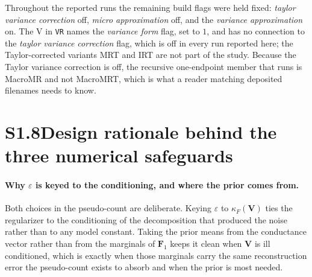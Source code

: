 \documentclass[11pt]{article}
\begin{document}
Throughout the reported runs the remaining build flags were held fixed: \emph{taylor variance
correction} off, \emph{micro approximation} off, and the \emph{variance approximation} on. The V in
\texttt{VR} names the \emph{variance form} flag, set to $1$, and has no connection to the
\emph{taylor variance correction} flag, which is off in every run reported here; the
Taylor-corrected variants MRT and IRT are not part of the study. Because the Taylor variance
correction is off, the recursive one-endpoint member that runs is MacroMR and not MacroMRT, which is
what a reader matching deposited filenames needs to know.


\section*{S1.8\quad Design rationale behind the three numerical safeguards}


\paragraph{Why $\varepsilon$ is keyed to the conditioning, and where the prior comes from.} Both
choices in the pseudo-count are deliberate. Keying $\varepsilon$ to $\kappa_F(\mathbf{V})$ ties the
regularizer to the conditioning of the decomposition that produced the noise rather than to any
model constant. Taking the prior means from the conductance vector rather than from the marginals of
$\mathbf{F}_1$ keeps it clean when $\mathbf{V}$ is ill conditioned, which is exactly when those
marginals carry the same reconstruction error the pseudo-count exists to absorb and when the prior
is most needed.
\end{document}
